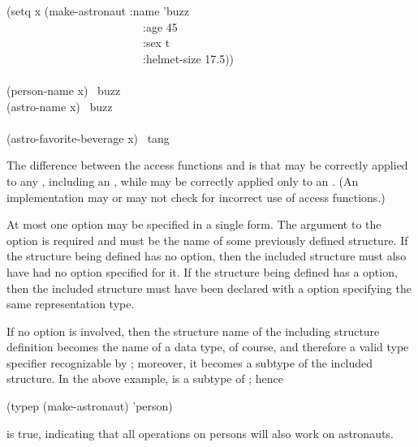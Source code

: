 \begin{flushdesc}
\begin{lisp}
(setq x (make-astronaut :name 'buzz \\
~~~~~~~~~~~~~~~~~~~~~~~~:age 45 \\
~~~~~~~~~~~~~~~~~~~~~~~~:sex t \\
~~~~~~~~~~~~~~~~~~~~~~~~:helmet-size 17.5)) \\
 \\
(person-name x) \EV\ buzz \\
(astro-name x) \EV\ buzz \\
\\
(astro-favorite-beverage x) \EV\ tang
\end{lisp}
The difference between the access functions  and 
is that  may be correctly applied to any ,
including an , while  may be correctly
applied only to an .  (An implementation may or may not
check for incorrect use of access functions.)

At most one  option may be specified in a single
 form.
The argument to the  option is required and must be the
name of some previously defined structure.  If the structure being
defined has no  option, then the included structure must
also have had no  option specified for it.
If the structure being defined has a  option,
then the included structure must have been declared with a 
option specifying the same representation type.

If no  option is involved, then
the structure name of the including structure definition
becomes the name of a data type, of course, and therefore
a valid type specifier recognizable by ; moreover, it becomes
a subtype of the included structure.  In the above example,
 is a subtype of ; hence
\begin{lisp}
(typep (make-astronaut) 'person)
\end{lisp}
is true, indicating that all operations on persons will also
work on astronauts.


\end{flushdesc}
